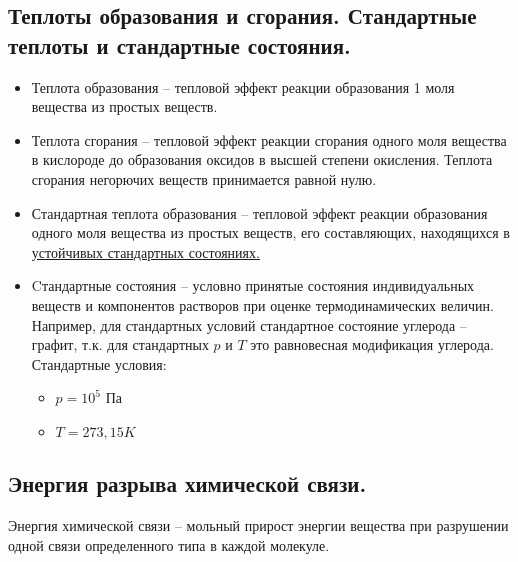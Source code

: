 \documentclass[14pt,a4paper]{scrartcl}
\begin{document}
	\subsection*{Теплоты образования и сгорания. Стандартные теплоты и стандартные состояния.}
	\begin{itemize}
		\item Теплота образования -- тепловой эффект реакции образования 1 моля вещества из простых веществ.
		\item Теплота сгорания -- тепловой эффект реакции сгорания одного моля вещества в кислороде до образования оксидов в высшей степени окисления. Теплота сгорания негорючих веществ принимается равной нулю.
		\item Стандартная теплота образования -- тепловой эффект реакции образования одного моля вещества из простых веществ, его составляющих, находящихся в \underline{устойчивых стандартных состояниях.}
		\item Cтандартные состояния -- условно принятые состояния индивидуальных веществ и компонентов растворов при оценке термодинамических величин.  
		Например, для стандартных условий стандартное состояние углерода -- графит, т.к. для стандартных $p$ и $T$ это равновесная модификация углерода.
		Стандартные условия:
		\begin{itemize}
			\item $p = 10^5$ Па
			\item $T = 273,15 K$
		\end{itemize}
	\end{itemize}
	\subsection*{Энергия разрыва химической связи.}
	Энергия химической связи -- мольный прирост энергии вещества при разрушении одной связи определенного типа в каждой молекуле.			
	
	
\end{document}
